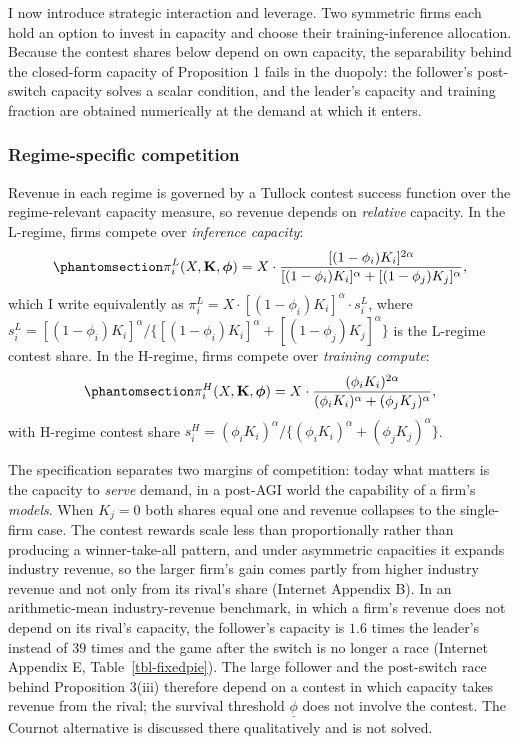 \documentclass[
  11pt,
  letterpaper,
]{scrartcl}
\begin{document}
I now introduce strategic interaction and leverage. Two symmetric firms
each hold an option to invest in capacity and choose their
training-inference allocation. Because the contest shares below depend
on own capacity, the separability behind the closed-form capacity of
Proposition 1 fails in the duopoly: the follower's post-switch capacity
solves a scalar condition, and the leader's capacity and training
fraction are obtained numerically at the demand at which it enters.

\subsubsection{Regime-specific
competition}\label{regime-specific-competition}

Revenue in each regime is governed by a Tullock contest success function
\citep{tullock1980efficient, skaperdas1996contest} over the
regime-relevant capacity measure, so revenue depends on \emph{relative}
capacity. In the L-regime, firms compete over \emph{inference capacity}:
\begin{equation}\protect\phantomsection\label{eq-contest-L}{
\pi_i^L(X, \mathbf{K}, \boldsymbol{\phi}) = X \cdot \frac{[(1-\phi_i)K_i]^{2\alpha}}{[(1-\phi_i)K_i]^\alpha + [(1-\phi_j)K_j]^\alpha},
}\end{equation} which I write equivalently as
\(\pi_i^L = X \cdot [(1-\phi_i)K_i]^\alpha \cdot s_i^L\), where
\(s_i^L = [(1-\phi_i)K_i]^\alpha / \{[(1-\phi_i)K_i]^\alpha + [(1-\phi_j)K_j]^\alpha\}\)
is the L-regime contest share. In the H-regime, firms compete over
\emph{training compute}:
\begin{equation}\protect\phantomsection\label{eq-contest-H}{
\pi_i^H(X, \mathbf{K}, \boldsymbol{\phi}) = X \cdot \frac{(\phi_i K_i)^{2\alpha}}{(\phi_i K_i)^\alpha + (\phi_j K_j)^\alpha},
}\end{equation} with H-regime contest share
\(s_i^H = (\phi_i K_i)^\alpha / \{(\phi_i K_i)^\alpha + (\phi_j K_j)^\alpha\}\).

The specification separates two margins of competition: today what
matters is the capacity to \emph{serve} demand, in a post-AGI world the
capability of a firm's \emph{models}. When \(K_j = 0\) both shares equal
one and revenue collapses to the single-firm case. The contest rewards
scale less than proportionally rather than producing a winner-take-all
pattern, and under asymmetric capacities it expands industry revenue, so
the larger firm's gain comes partly from higher industry revenue and not
only from its rival's share (Internet Appendix B). In an arithmetic-mean
industry-revenue benchmark, in which a firm's revenue does not depend on
its rival's capacity, the follower's capacity is \(1.6\) times the
leader's instead of \(39\) times and the game after the switch is no
longer a race (Internet Appendix E, Table~\ref{tbl-fixedpie}). The large
follower and the post-switch race behind Proposition 3(iii) therefore
depend on a contest in which capacity takes revenue from the rival; the
survival threshold \(\underline{\phi}\) does not involve the contest.
The Cournot alternative is discussed there qualitatively and is not
solved.
\end{document}

